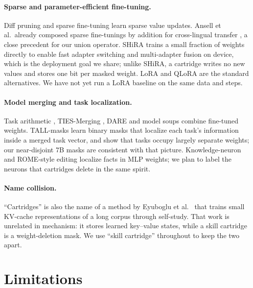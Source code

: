 \documentclass[11pt]{article}
\begin{document}
\paragraph{Sparse and parameter-efficient fine-tuning.} Diff pruning \citep{guo2020diffpruning} and sparse fine-tuning \citep{ansell2021composable,ansell2024scaling} learn sparse value updates. Ansell et al.\ already composed sparse fine-tunings by addition for cross-lingual transfer \citep{ansell2021composable}, a close precedent for our union operator. SHiRA \citep{bhardwaj2024shira} trains a small fraction of weights directly to enable fast adapter switching and multi-adapter fusion on device, which is the deployment goal we share; unlike SHiRA, a cartridge writes no new values and stores one bit per masked weight. LoRA \citep{hu2021lora} and QLoRA \citep{dettmers2023qlora} are the standard alternatives. We have not yet run a LoRA baseline on the same data and steps.

\paragraph{Model merging and task localization.} Task arithmetic \citep{ilharco2022taskarith}, TIES-Merging \citep{yadav2023ties}, DARE \citep{yu2023dare} and model soups \citep{wortsman2022soups} combine fine-tuned weights. TALL-masks \citep{wang2024tall} learn binary masks that localize each task's information inside a merged task vector, and show that tasks occupy largely separate weights; our near-disjoint 7B masks are consistent with that picture. Knowledge-neuron and ROME-style editing \citep{dai2021knowledge,meng2022rome} localize facts in MLP weights; we plan to label the neurons that cartridges delete in the same spirit.

\paragraph{Name collision.} ``Cartridges'' is also the name of a method by Eyuboglu et al.\ \citep{eyuboglu2025cartridges} that trains small KV-cache representations of a long corpus through self-study. That work is unrelated in mechanism: it stores learned key--value states, while a skill cartridge is a weight-deletion mask. We use ``skill cartridge'' throughout to keep the two apart.

\section{Limitations}
\label{sec:limits}
\end{document}
